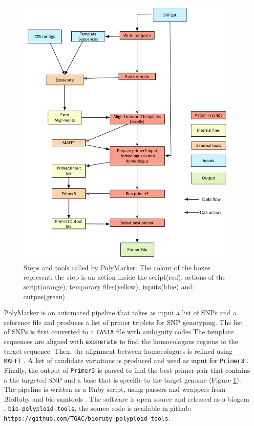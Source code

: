 \begin{figure}
\includegraphics[width=1\textwidth]{PolyMarker/Figures/pipeline.pdf}
        \caption{Steps and tools called by PolyMarker. The colour of the boxes represent: the step is an action inside the script(red); actions of the script(orange); temporary files(yellow); inputs(blue) and; outpus(green)}
        \label{fig:poly:pipeline}
\end{figure}

PolyMarker is an automated pipeline that takes as input a list of SNPs and a reference file and produces a list of primer triplets for SNP genotyping. 
The list of SNPs is first converted to a \texttt{FASTA} file with ambiguity codes \citep{Cornish-Bowden1985} 
The template sequences are aligned with \texttt{exonerate} \citep{Slater2005}  to find the homoeologous regions to the target sequence. 
Then, the alignment between homoeologues is refined using \texttt{MAFFT} \citep{Katoh2013}. 
A list of candidate variations is produced and used as input for \texttt{Primer3} \citep{Rozen}. 
Finally, the output of \texttt{Primer3} is parsed to find the best primer pair that contains a the targeted SNP and a base that is specific to the target genome (Figure \ref{fig:poly:pipeline}).  
The pipeline is written as a Ruby script, using parsers and wrappers from BioRuby \citep{Goto2010} and bio-samtools \citep{Etherington2015,Ramirez-Gonzalez2012}. 
The software is open source and released as a biogem \citep{Bonnal2012}, \texttt{bio-polyploid-tools}, the source code is available in github: \texttt{https://github.com/TGAC/bioruby-polyploid-tools}.


